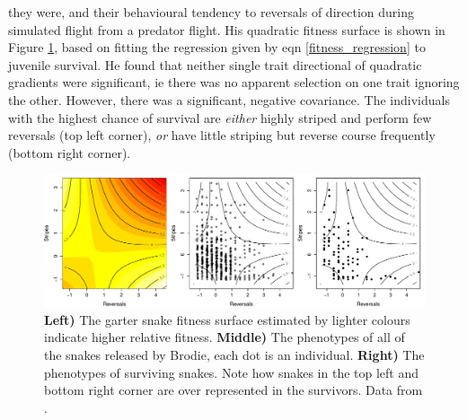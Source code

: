 they were, and their behavioural tendency to reversals of direction
during simulated flight from a predator flight. His quadratic fitness surface is shown in Figure
\ref{fig:Garter_snakes_Brodie}, based on fitting the
regression given by eqn \eqref{fitness_regression} to juvenile
survival. He found that neither single trait directional of quadratic
gradients were significant, ie there was no apparent selection on one 
trait ignoring the other. However, there was a significant, negative
covariance. The individuals with the highest chance of survival are
{\it either} highly striped and perform few reversals (top left
corner), {\it or} have little striping but reverse course frequently
(bottom right corner). 

\begin{figure}
\begin{center} 
\includegraphics[width= \textwidth]{Journal_figs/Quant_gen/Garter_snakes_Brodie/Garter_snakes_Brodie.pdf}
\end{center}
\caption{ {\bf Left)} The garter snake fitness surface estimated by \citet{brodie1992correlational}
 lighter colours indicate higher
 relative fitness. {\bf Middle)} The phenotypes of all of the snakes released
   by Brodie, each dot is an individual. {\bf Right)} The phenotypes
   of surviving snakes. Note how snakes in the top left and bottom
   right corner are over represented in the survivors. Data from  \citet{brodie1992correlational}
  . } \label{fig:Garter_snakes_Brodie}
\end{figure} 




